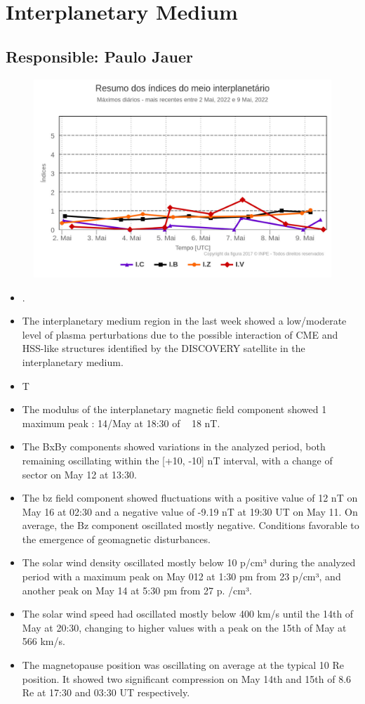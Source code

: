 \documentclass[a4paper, 10pt]{article}
\begin{document}
    \section{Interplanetary Medium} 
 \subsection{Responsible: Paulo Jauer} 
 
 \begin{figure}[H]
    \centering
    \includegraphics[width=14cm]{./figures//figureMIIndex.png}
\end{figure}
 \begin{itemize}
 \item .
\item The interplanetary medium region in the last week showed a low/moderate level of plasma perturbations due to the possible interaction of CME and HSS-like structures identified by the DISCOVERY satellite in the interplanetary medium.
\item  T
\item The modulus of the interplanetary magnetic field component showed 1 maximum peak : 14/May at 18:30 of ~ 18 nT.
\item  The BxBy components showed variations in the analyzed period, both remaining oscillating within the [+10, -10] nT interval, with a change of sector on May 12 at 13:30.
\item  The bz field component showed fluctuations with a positive value of 12 nT on May 16 at 02:30 and a negative value of -9.19 nT at 19:30 UT on May 11. On average, the Bz component oscillated mostly negative. Conditions favorable to the emergence of geomagnetic disturbances. 
\item The solar wind density oscillated mostly below 10 p/cm³ during the analyzed period with a maximum peak on May 012 at 1:30 pm from 23 p/cm³, and another peak on May 14 at 5:30 pm from 27 p. /cm³. 
\item The solar wind speed had oscillated mostly below 400 km/s until the 14th of May at 20:30, changing to higher values ​​with a peak on the 15th of May at 566 km/s. 
\item The magnetopause position was oscillating on average at the typical 10 Re position. It showed two significant compression on May 14th and 15th of 8.6 Re at 17:30 and 03:30 UT respectively.
\end{itemize} 
\end{document}
